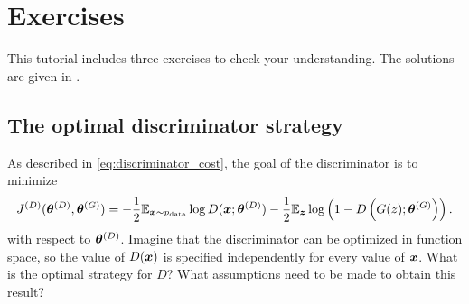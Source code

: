 \section{Exercises}

This tutorial includes three exercises to check your understanding.
The solutions are given in .

\subsection{The optimal discriminator strategy}
\label{sec:opt_d}

As described in \eqref{eq:discriminator_cost}, the goal of the discriminator is to minimize
\begin{equation}
  J^{(D)}({\bm{\theta}}^{(D)}, {\bm{\theta}}^{(G)}) = -\frac{1}{2} \mathbb{E}_{{\bm{x}} \sim p_{\rm{data}}} \log D({\bm{x}}; {\bm{\theta}}^{(D)}) - \frac{1}{2} \mathbb{E}_{{\bm{z}}} \log \left(1 - D\left( G(z); {\bm{\theta}}^{(G)} \right) \right).
\end{equation}
with respect to ${\bm{\theta}}^{(D)}$.
Imagine that the discriminator can be optimized in function space, so the value of
$D({\bm{x}})$ is specified independently for every value of ${\bm{x}}$.
What is the optimal strategy for $D$?
What assumptions need to be made to obtain this result?

